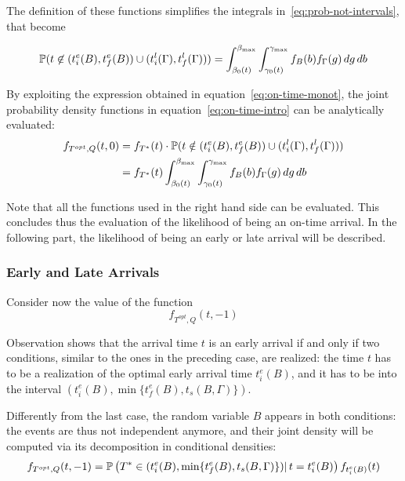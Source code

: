 The definition of these functions simplifies the integrals in~\eqref{eq:prob-not-intervals}, that become

\begin{equation}
  \label{eq:on-time-monot}
  \mathbb{P}( t \not\in (t_i^e(B), t_f^e(B)) \cup (t_i^l(\Gamma), t_f^l(\Gamma))) = \int_{\beta_0(t)}^{\beta_{\text{max}}}\int_{\gamma_0(t)}^{\gamma_{\text{max}}}f_B(b)f_\Gamma(g)\, dg\, db
\end{equation}

By exploiting the expression obtained in equation~\eqref{eq:on-time-monot},
the joint probability density functions in equation~\eqref{eq:on-time-intro} can be analytically evaluated:
\begin{equation}
  \label{eq:on-time-final}
  \begin{split}
    f_{T^{opt}, Q}(t, 0) & = f_{T^*}(t) \cdot \mathbb{P}(t \notin (t_i^e(B), t_f^e(B)) \cup (t_i^l(\Gamma), t_f^l(\Gamma))) \\
    & = f_{T^*}(t)\int_{\beta_0(t)}^{\beta_{\text{max}}}\int_{\gamma_0(t)}^{\gamma_{\text{max}}}f_B(b)f_\Gamma(g)\, dg\, db
  \end{split}
\end{equation}

Note that all the functions used in the right hand side can be evaluated.
This concludes thus the evaluation of the likelihood of being an on-time arrival.
In the following part, the likelihood of being an early or late arrival will be described.

\subsubsection{Early and Late Arrivals}

Consider now the value of the function
\begin{equation*}
  f_{T^{opt}, Q}(t, -1)
\end{equation*}

Observation shows that the arrival time \(t\) is an early arrival if and only if two conditions,
similar to the ones in the preceding case,
are realized:
the time \(t\) has to be a realization of the optimal early arrival time \(t_i^e(B)\),
and it has to be into the interval \((t_i^e(B), \min\{t_f^e(B), t_s(B, \Gamma)\})\).

Differently from the last case, the random variable \(B\) appears in both conditions:
the events are thus not independent anymore,
and their joint density will be computed via its decomposition in conditional densities:
\begin{equation}
  \label{eq:late-joint-decomp}
  f_{T^{opt}, Q}(t, -1) = \mathbb{P}\left(T^* \in (t_i^e(B), \min\{t_f^e(B), t_s(B, \Gamma)\})|\, t = t_i^e(B)\right) f_{t_i^e(B)}(t)
\end{equation}

